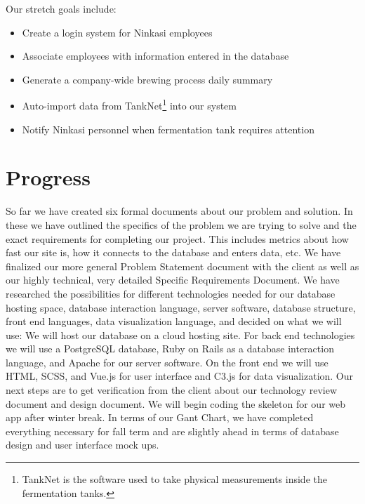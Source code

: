 \documentclass[draftclsnofoot,onecolumn,letterpaper,10pt,compsoc]{IEEEtran}
\begin{document}
Our stretch goals include:
\begin{itemize}
  \item Create a login system for Ninkasi employees
	\item Associate employees with information entered in the database
  \item Generate a company-wide brewing process daily summary
  \item Auto-import data from TankNet\footnote{TankNet is the software used to take physical measurements inside the fermentation tanks.} into our system
  \item Notify Ninkasi personnel when fermentation tank requires attention
\end{itemize}
\section{Progress}
So far we have created six formal documents about our problem and solution. In these we have outlined the specifics of the problem we are trying to solve and the exact requirements for completing our project. This includes metrics about how fast our site is, how it connects to the database and enters data, etc. We have finalized our more general Problem Statement document with the client as well as our highly technical, very detailed Specific Requirements Document. We have researched the possibilities for different technologies needed for our database hosting space, database interaction language, server software, database structure, front end languages, data visualization language, and decided on what we will use:
We will host our database on a cloud hosting site. For back end technologies we will use a PostgreSQL database, Ruby on Rails as a database interaction language, and Apache for our server software. On the front end we will use HTML, SCSS, and Vue.js for user interface and C3.js for data visualization.
Our next steps are to get verification from the client about our technology review document and design document. We will begin coding the skeleton for our web app after winter break.
In terms of our Gant Chart, we have completed everything necessary for fall term and are slightly ahead in terms of database design and user interface mock ups.
\end{document}
